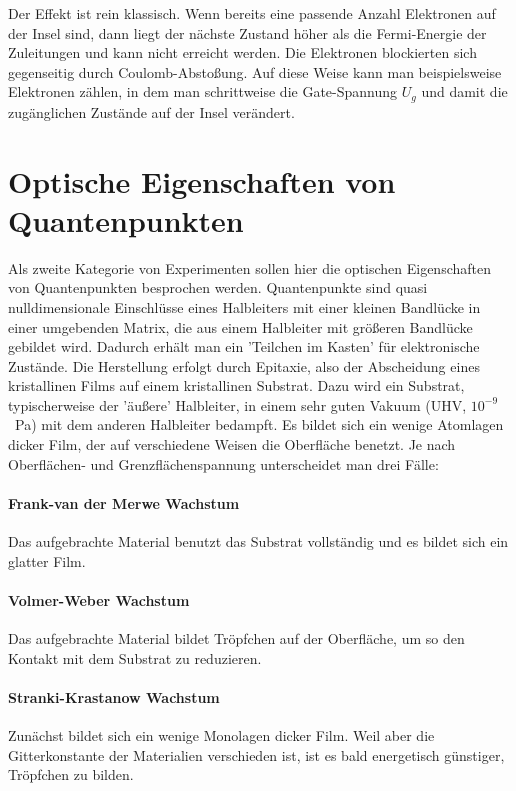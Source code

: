 Der Effekt ist rein klassisch. Wenn bereits eine passende Anzahl Elektronen auf der Insel sind, dann liegt der nächste Zustand höher als die Fermi-Energie der Zuleitungen und kann nicht erreicht werden. Die Elektronen blockierten sich gegenseitig durch Coulomb-Abstoßung. Auf diese Weise kann man beispielsweise Elektronen zählen, in dem man schrittweise die Gate-Spannung $U_g$ und damit die zugänglichen Zustände auf der Insel verändert.



\section{Optische Eigenschaften von Quantenpunkten}

Als zweite Kategorie von Experimenten sollen hier die optischen Eigenschaften von Quantenpunkten besprochen werden. Quantenpunkte sind quasi nulldimensionale Einschlüsse eines Halbleiters mit einer kleinen Bandlücke in einer umgebenden Matrix, die aus einem Halbleiter mit größeren Bandlücke gebildet wird. Dadurch erhält man ein 'Teilchen im Kasten' für elektronische Zustände. Die Herstellung erfolgt durch Epitaxie, also der Abscheidung eines kristallinen Films auf einem kristallinen Substrat. Dazu wird ein Substrat, typischerweise der 'äußere' Halbleiter, in einem sehr guten Vakuum (UHV, $10^{-9}$~Pa) mit dem anderen Halbleiter bedampft. Es bildet sich ein wenige Atomlagen dicker Film, der auf verschiedene Weisen die Oberfläche benetzt. Je nach Oberflächen- und Grenzflächenspannung unterscheidet man drei Fälle:

\paragraph*{Frank-van der Merwe Wachstum} Das aufgebrachte Material benutzt das Substrat vollständig und es bildet sich ein glatter Film.

\paragraph*{Volmer-Weber Wachstum} Das aufgebrachte Material bildet Tröpfchen auf der Oberfläche, um so den Kontakt mit dem Substrat zu reduzieren.

\paragraph*{Stranki-Krastanow Wachstum} Zunächst bildet sich ein wenige Monolagen dicker Film. Weil aber die Gitterkonstante der Materialien verschieden ist, ist es bald energetisch günstiger, Tröpfchen zu bilden.

